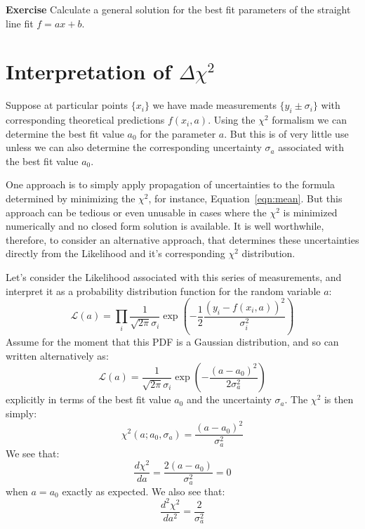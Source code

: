 \documentclass[12pt]{article}
\begin{document}
{\bf Exercise} Calculate a general solution for the best fit parameters of the straight line fit $f = a x + b$.

\section{Interpretation of $\Delta \chi^2$}

Suppose at particular points $\{x_i\}$ we have made measurements $\{y_i \pm \sigma_i\}$ with corresponding theoretical predictions $f(x_i, a)$.  Using the $\chi^2$ formalism we can determine the best fit value $a_0$ for the parameter $a$.  But this is of very little use unless we can also determine the corresponding uncertainty $\sigma_a$ associated with the best fit value $a_0$.  

One approach is to simply apply propagation of uncertainties to the formula determined by minimizing the $\chi^2$, for instance, Equation~\ref{eqn:mean}.  But this approach can be tedious or even unusable in cases where the $\chi^2$ is minimized numerically and no closed form solution is available.   It is well worthwhile, therefore, to consider an alternative approach, that determines these uncertainties directly from the Likelihood and it's corresponding $\chi^2$ distribution.

Let's consider the Likelihood associated with this series of measurements, and interpret it as a probability distribution function for the random variable $a$:
\begin{displaymath}
\mathcal{L}(a) = \prod_i \frac{1}{\sqrt{2\pi} \sigma_i} \exp\left(-\frac{1}{2} \frac{(y_i-f(x_i,a))^2}{\sigma_i^2}\right)
\end{displaymath}
Assume for the moment that this PDF is a Gaussian distribution, and so can written alternatively
as:
\begin{displaymath}
\mathcal{L}(a) =  \frac{1}{\sqrt{2\pi} \sigma_i} \exp\left(-\frac{(a-a_0)^2}{2\sigma_a^2}\right)
\end{displaymath}
explicitly in terms of the best fit value $a_0$ and the uncertainty $\sigma_a$.  The $\chi^2$ is then simply:
\begin{equation} \label{eqn:chisqa}
\chi^2(a; a_0, \sigma_a) = \frac{(a-a_0)^2}{\sigma_a^2}
\end{equation}
We see that:
\begin{displaymath}
\frac{d\chi^2}{da} = \frac{2 (a-a_0)}{\sigma_a^2} = 0
\end{displaymath}
when $a=a_0$ exactly as expected.  We also see that:
\begin{displaymath}
\frac{d^2\chi^2}{da^2} = \frac{2}{\sigma_a^2}
\end{displaymath}
\end{document}
